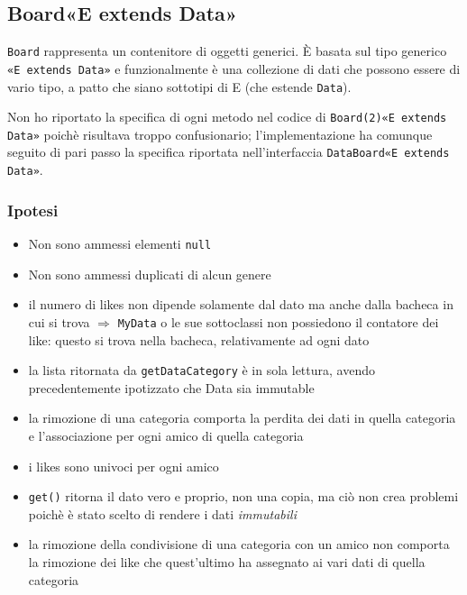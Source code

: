 \documentclass[10pt, a4paper]{article}
\begin{document}
\bigskip
\subsection{Board«E extends Data» }

\texttt{Board} rappresenta un contenitore di oggetti generici. È basata sul tipo generico \texttt{«E extends Data»} e funzionalmente è una collezione di dati che possono essere di vario tipo, a patto che siano sottotipi di E (che estende \texttt{Data}).

Non ho riportato la specifica di ogni metodo nel codice di \texttt{Board(2)«E extends Data»} poichè risultava troppo confusionario; l'implementazione ha comunque seguito di pari passo la specifica riportata nell'interfaccia \texttt{DataBoard«E extends Data»}.
\subsubsection{Ipotesi}
\begin{itemize}
\item Non sono ammessi elementi \texttt{null}
\item Non sono ammessi duplicati di alcun genere
\item il numero di likes non dipende solamente dal dato ma anche dalla bacheca in cui si trova $\Rightarrow$ \texttt{MyData} o le sue sottoclassi non possiedono il contatore dei like: questo si trova nella bacheca, relativamente ad ogni dato
\item la lista ritornata da \texttt{getDataCategory} è in sola lettura, avendo precedentemente ipotizzato che Data sia immutable
\item la rimozione di una categoria comporta la perdita dei dati in quella categoria e l'associazione per ogni amico di quella categoria
\item i likes sono univoci per ogni amico
\item \texttt{get()} ritorna il dato vero e proprio, non una copia, ma ciò non crea problemi poichè è stato scelto di rendere i dati \textit{immutabili}
\item la rimozione della condivisione di una categoria con un amico non comporta la rimozione dei like che quest'ultimo ha assegnato ai vari dati di quella categoria
\end{itemize}
\end{document}
